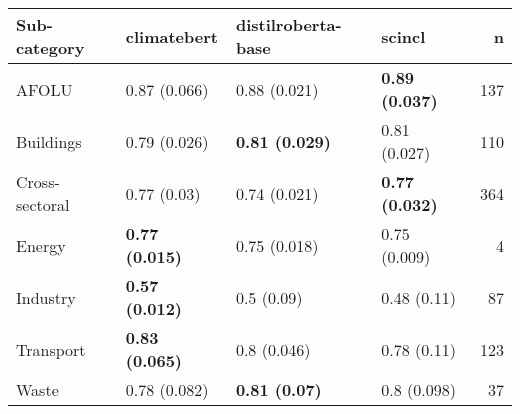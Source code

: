 \begin{tabular}{llllr}
\toprule
Sub-category & climatebert & distilroberta-base & scincl & n \\
\midrule
AFOLU & 0.87 (0.066) & 0.88 (0.021) & \textbf{0.89 (0.037)} & 137 \\
Buildings & 0.79 (0.026) & \textbf{0.81 (0.029)} & 0.81 (0.027) & 110 \\
Cross-sectoral & 0.77 (0.03) & 0.74 (0.021) & \textbf{0.77 (0.032)} & 364 \\
Energy & \textbf{0.77 (0.015)} & 0.75 (0.018) & 0.75 (0.009) & 4 \\
Industry & \textbf{0.57 (0.012)} & 0.5 (0.09) & 0.48 (0.11) & 87 \\
Transport & \textbf{0.83 (0.065)} & 0.8 (0.046) & 0.78 (0.11) & 123 \\
Waste & 0.78 (0.082) & \textbf{0.81 (0.07)} & 0.8 (0.098) & 37 \\
\bottomrule
\end{tabular}
